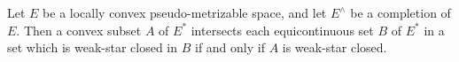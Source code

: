 Let $E$ be a locally convex pseudo-metrizable space, and let $E^{\wedge}$ be a completion of $E$. Then a convex subset $A$ of $E^{*}$ intersects each equicontinuous set $B$ of $E^{*}$ in a set which is weak-star closed in $B$ if and only if $A$ is weak-star closed.
